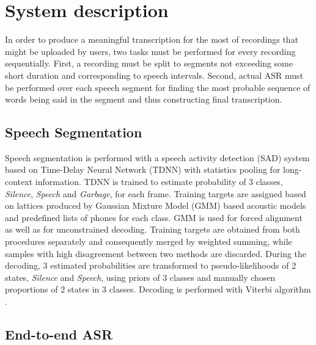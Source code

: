 \documentclass[12pt,a4paper]{article}
\begin{document}
\section{System description}

In order to produce a meaningful transcription for the most
of recordings that might be uploaded by users,
two tasks must be performed for every recording sequentially.
First, a recording must be split to segments
not exceeding some short duration and corresponding to speech intervals.
Second, actual ASR must be performed over each speech segment
for finding the most probable sequence of words being said
in the segment and thus constructing final transcription.

\subsection{Speech Segmentation}

Speech segmentation is performed with a speech activity detection (SAD)
system based on Time-Delay Neural Network (TDNN) \cite{waibel1990phoneme}
with statistics pooling \cite{ghahremani2016acoustic} for long-context information.
TDNN is trained to estimate probability of 3 classes,
\textit{Silence}, \textit{Speech} and \textit{Garbage},
for each frame. Training targets are assigned based on lattices 
produced by  Gaussian Mixture Model (GMM) based acoustic models and predefined lists
of phones for each class. GMM is used for forced alignment
as well as for unconstrained decoding. Training targets
are obtained from both procedures separately and consequently
merged by weighted summing, while samples with high disagreement
between two methods are discarded.
During the decoding, 3 estimated probabilities are transformed
to pseudo-likelihoods of 2 states, \textit{Silence} and \textit{Speech},
using priors of 3 classes and manually chosen proportions of 2 states in 3 classes.
Decoding is performed with Viterbi algorithm \cite{viterbi1967error}.

\subsection{End-to-end ASR}
\end{document}
